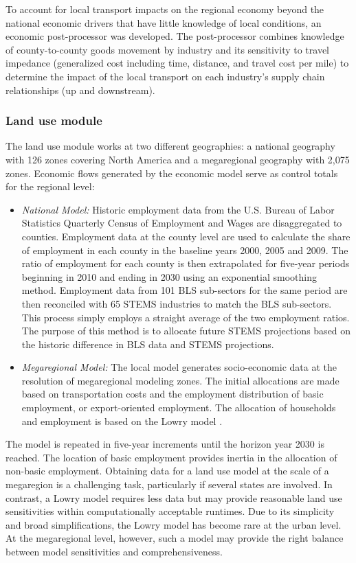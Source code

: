 To account for local transport impacts on the regional economy beyond the national economic drivers that have little knowledge of local conditions, an economic post-processor was developed. The post-processor combines knowledge of county-to-county goods movement by industry and its sensitivity to travel impedance (generalized cost including time, distance, and travel cost per mile) to determine the impact of the local transport on each industry's supply chain relationships (up and downstream).

\subsubsection{Land use module}

The land use module works at two different geographies: a national geography with 126 zones covering North America and a megaregional geography with 2,075 zones. Economic flows generated by the economic model serve as control totals for the regional level:

\begin{itemize}
\item
  \emph{National Model:} Historic employment data from the U.S. Bureau of Labor Statistics Quarterly Census of Employment and Wages are disaggregated to counties. Employment data at the county level are used to calculate the share of employment in each county in the baseline years 2000, 2005 and 2009. The ratio of employment for each county is then extrapolated for five-year periods beginning in 2010 and ending in 2030 using an exponential smoothing method. Employment data from 101 BLS sub-sectors for the same period are then reconciled with 65 STEMS industries to match the BLS sub-sectors. This process simply employs a straight average of the two employment ratios. The purpose of this method is to allocate future STEMS projections based on the historic difference in BLS data and STEMS projections.
\item
\emph{Megaregional Model:} The local model generates socio-economic data at the resolution of megaregional modeling zones. The initial allocations are made based on transportation costs and the employment distribution of basic employment, or export-oriented employment. The allocation of households and employment is based on the Lowry model \citep{lowry64}.
\end{itemize}

The model is repeated in five-year increments until the horizon year 2030 is reached. The location of basic employment provides inertia in the allocation of non-basic employment. Obtaining data for a land use model at the scale of a megaregion is a challenging task, particularly if several states are involved. In contrast, a Lowry model requires less data but may provide reasonable land use sensitivities within computationally acceptable runtimes. Due to its simplicity and broad simplifications, the Lowry model has become rare at the urban level. At the megaregional level, however, such a model may provide the right balance between model sensitivities and comprehensiveness.

